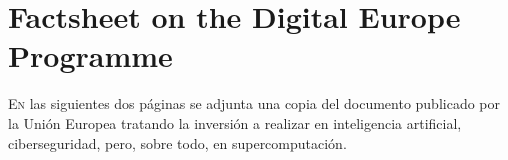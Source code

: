 \chapter{Factsheet on the Digital Europe Programme}
\label{chap:factsheet_europe}

\lettrine{E}{n} las siguientes dos páginas se adjunta una copia del documento publicado por la Unión Europea tratando la inversión a realizar en inteligencia artificial, ciberseguridad, pero, sobre todo, en supercomputación.

